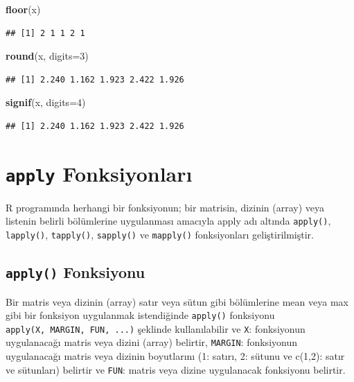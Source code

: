 \documentclass[
]{book}
\newenvironment{Shaded}{\begin{snugshade}}{\end{snugshade}}
\newcommand{\AttributeTok}[1]{\textcolor[rgb]{0.13,0.29,0.53}{#1}}
\newcommand{\DecValTok}[1]{\textcolor[rgb]{0.00,0.00,0.81}{#1}}
\newcommand{\FunctionTok}[1]{\textcolor[rgb]{0.13,0.29,0.53}{\textbf{#1}}}
\newcommand{\NormalTok}[1]{#1}
\begin{document}
\begin{Shaded}
\begin{Highlighting}[]
\FunctionTok{floor}\NormalTok{(x)}
\end{Highlighting}
\end{Shaded}

\begin{verbatim}
## [1] 2 1 1 2 1
\end{verbatim}

\begin{Shaded}
\begin{Highlighting}[]
\FunctionTok{round}\NormalTok{(x, }\AttributeTok{digits=}\DecValTok{3}\NormalTok{)}
\end{Highlighting}
\end{Shaded}

\begin{verbatim}
## [1] 2.240 1.162 1.923 2.422 1.926
\end{verbatim}

\begin{Shaded}
\begin{Highlighting}[]
\FunctionTok{signif}\NormalTok{(x, }\AttributeTok{digits=}\DecValTok{4}\NormalTok{)}
\end{Highlighting}
\end{Shaded}

\begin{verbatim}
## [1] 2.240 1.162 1.923 2.422 1.926
\end{verbatim}

\section{\texorpdfstring{\texttt{apply} Fonksiyonları}{apply Fonksiyonları}}\label{apply-fonksiyonlarux131}

R programında herhangi bir fonksiyonun; bir matrisin, dizinin (array) veya listenin belirli bölümlerine uygulanması amacıyla apply adı altında \texttt{apply()}, \texttt{lapply()}, \texttt{tapply()}, \texttt{sapply()} ve \texttt{mapply()} fonksiyonları geliştirilmiştir.

\subsection{\texorpdfstring{\texttt{apply()} Fonksiyonu}{apply() Fonksiyonu}}\label{apply-fonksiyonu}

Bir matris veya dizinin (array) satır veya sütun gibi bölümlerine mean veya max gibi bir fonksiyon uygulanmak istendiğinde \texttt{apply()} fonksiyonu \texttt{apply(X,\ MARGIN,\ FUN,\ ...)} şeklinde kullanılabilir ve \texttt{X}: fonksiyonun uygulanacağı matris veya dizini (array) belirtir, \texttt{MARGIN}: fonksiyonun uygulanacağı matris veya dizinin boyutlarını (1: satırı, 2: sütunu ve c(1,2): satır ve sütunları) belirtir ve \texttt{FUN}: matris veya dizine uygulanacak fonksiyonu belirtir.
\end{document}
